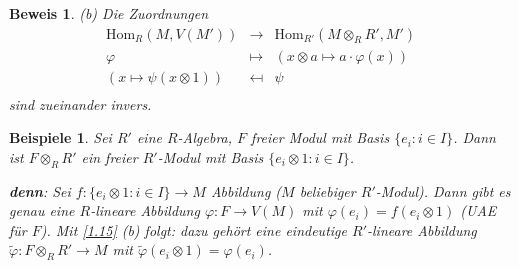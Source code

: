 \documentclass[a4paper,12pt]{scrbook}
\theoremstyle{break}
\theoremstyle{nonumberbreak}
\newtheorem{Bew}{Beweis}
\newtheorem{nnBsp}{Beispiele}
\theoremstyle{nonumberplain}
\begin{document}
\begin{Bew}
\item[(b)] Die Zuordnungen $$\begin{array}{rcl}
    \textrm{Hom}_R(M, V(M')) & \to & \textrm{Hom}_{R'}(M\otimes_R R', M')\\
                     \varphi & \mapsto & (x\otimes a\mapsto a\cdot \varphi(x))\\
    (x\mapsto \psi(x\otimes 1))&\mapsfrom & \psi \\
  \end{array}$$
  sind zueinander invers.
\end{Bew}

\begin{nnBsp}
  Sei $R'$ eine $R$-Algebra, $F$ freier Modul mit Basis $\{e_i:i\in I\}$. Dann ist $F\otimes_R R'$ ein freier
  $R'$-Modul mit Basis $\{e_i\otimes 1:i\in I\}$.

  \textbf{denn}: Sei $f:\{e_i\otimes 1: i\in I\} \to M$ Abbildung ($M$ beliebiger $R'$-Modul).
  Dann gibt es genau eine $R$-lineare Abbildung $\varphi: F\to V(M)$ mit $\varphi(e_i)=f(e_i\otimes 1)$ (UAE für $F$).
  Mit \ref{1.15} (b) folgt: dazu gehört eine eindeutige $R'$-lineare Abbildung
  $\tilde\varphi: F\otimes_R R'\to M$ mit $\tilde\varphi(e_i\otimes 1)=\varphi(e_i)$.
\end{nnBsp}
\end{document}
